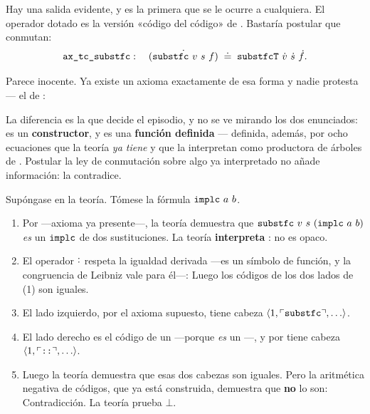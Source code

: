Hay una salida evidente, y es la primera que se le ocurre a cualquiera. El operador dotado
 es la versión «código del código» de . Bastaría postular que
conmutan:
\[
  \text{\ident{ax_tc_substfc}}:\quad
  \dotado{(\text{\ident{substfc}}\ v\ s\ f)} \;\doteq\;
  \text{\ident{substfcT}}\ \dotado{v}\ \dotado{s}\ \dotado{f}.
\]


Parece inocente. Ya existe un axioma exactamente de esa forma y nadie protesta — el de :


La diferencia es la que decide el episodio, y no se ve mirando los dos enunciados:  es
un \textbf{constructor}, y  es una \textbf{función definida} — definida, además, por
ocho ecuaciones que la teoría \emph{ya tiene} y que la interpretan como productora de árboles de
. Postular la ley de conmutación sobre algo ya interpretado no añade información:
la contradice.

\begin{refutado}
Supóngase  en la teoría. Tómese la fórmula $\text{\ident{implc}}\ a\ b$.
\begin{enumerate}
\item Por  —axioma ya presente—, la teoría demuestra que
  $\text{\ident{substfc}}\ v\ s\ (\text{\ident{implc}}\ a\ b)$ \emph{es} un
  $\text{\ident{implc}}$ de dos sustituciones. La teoría \textbf{interpreta} : no
  es opaco.
\item El operador $\dot{\cdot}$ respeta la igualdad derivada —es un símbolo de función, y la
  congruencia de Leibniz vale para él—:
  Luego los códigos de los dos lados de (1) son iguales.
\item El lado izquierdo, por el axioma supuesto, tiene cabeza
  $\langle 1, \codigo{\text{\ident{substfc}}}, \ldots\rangle$.
\item El lado derecho es el código de un  —porque  \emph{es} un
  —, y por  tiene cabeza
  $\langle 1, \codigo{\ident{::}}, \ldots\rangle$.
\item Luego la teoría demuestra que esas dos cabezas son iguales. Pero la aritmética negativa de
  códigos, que ya está construida, demuestra que \textbf{no} lo son:
  Contradicción. La teoría prueba $\bot$.
\end{enumerate}
\end{refutado}

